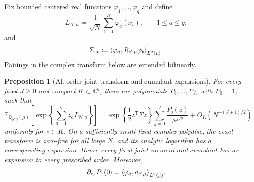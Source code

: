 \documentclass[11pt,reqno]{amsart}
\numberwithin{equation}{section}
\theoremstyle{plain}
\newtheorem{prop}[prop]{Proposition}
\theoremstyle{definition}
\DeclarePairedDelimiter{\ip}{\langle}{\rangle}
\newcommand{\C}{\mathbb C}
\newcommand{\E}{\mathbb E}
\newcommand{\Q}{\mathbb Q}
\newcommand{\be}{\beta}
\begin{document}
Fix bounded centered real functions $\varphi_1,\ldots,\varphi_q$ and define
\begin{equation}
 L_{N,a}\coloneqq\frac1{\sqrt N}\sum_{i=1}^N\varphi_a(x_i),
 \qquad 1\leq a\leq q,
 \label{eq:prescribed-bounded-linear-statistics}
\end{equation}
and
\begin{equation}
 \Sigma_{ab}\coloneqq\ip*{\varphi_a,R_{\be,\mu}\varphi_b}_{L^2(\mu)}.
 \label{eq:prescribed-linear-covariance}
\end{equation}
Pairings in the complex transform below are extended bilinearly.

\begin{prop}[All-order joint transform and cumulant expansions]
\label{prop:prescribed-linear-statistic-expansions}
For every fixed $J\geq0$ and compact $K\subset\C^q$, there are polynomials $P_0,\ldots,P_J$, with $P_0=1$, such that
\begin{equation}
 \E_{\Q_{N,\be}(\mu)}\left[
 \exp\left\{\sum_{a=1}^qz_aL_{N,a}\right\}\right]
 =\exp\left\{\frac12z^{\mathsf T}\Sigma z\right\}
 \sum_{j=0}^{J}\frac{P_j(z)}{N^{j/2}}
 +O_K(N^{-(J+1)/2})
 \label{eq:prescribed-mgf-expansion}
\end{equation}
uniformly for $z\in K$.  On a sufficiently small fixed complex polydisc, the exact transform is zero-free for all large $N$, and its analytic logarithm has a corresponding expansion.  Hence every fixed joint moment and cumulant has an expansion to every prescribed order.  Moreover,
\begin{equation}
 \partial_{z_a}P_1(0)=\ip*{\varphi_a,a_{\be,\mu}}_{L^2(\mu)}.
 \label{eq:prescribed-first-mean-correction}
\end{equation}
\end{prop}
\end{document}
